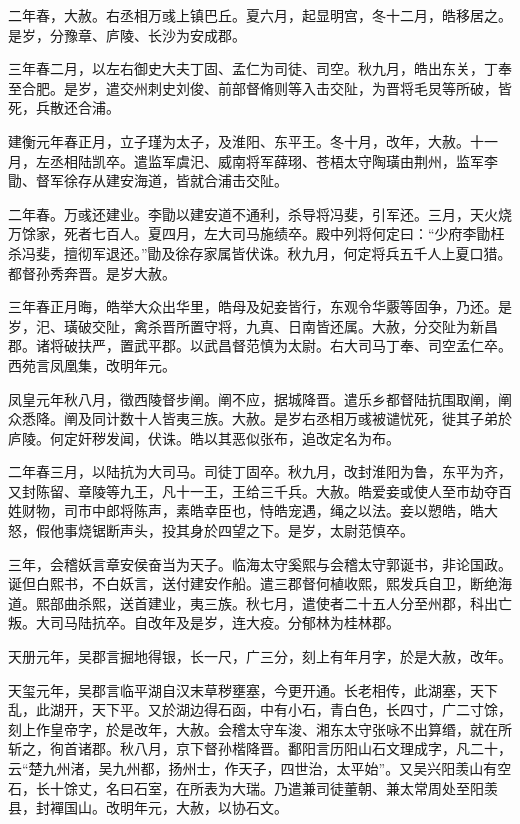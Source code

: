 \documentclass[12pt,UTF8]{ctexbook}
\begin{document}
二年春，大赦。右丞相万彧上镇巴丘。夏六月，起显明宫，冬十二月，皓移居之。是岁，分豫章、庐陵、长沙为安成郡。

三年春二月，以左右御史大夫丁固、孟仁为司徒、司空。秋九月，皓出东关，丁奉至合肥。是岁，遣交州刺史刘俊、前部督脩则等入击交阯，为晋将毛炅等所破，皆死，兵散还合浦。

建衡元年春正月，立子瑾为太子，及淮阳、东平王。冬十月，改年，大赦。十一月，左丞相陆凯卒。遣监军虞汜、威南将军薛珝、苍梧太守陶璜由荆州，监军李勖、督军徐存从建安海道，皆就合浦击交阯。

二年春。万彧还建业。李勖以建安道不通利，杀导将冯斐，引军还。三月，天火烧万馀家，死者七百人。夏四月，左大司马施绩卒。殿中列将何定曰：“少府李勖枉杀冯斐，擅彻军退还。”勖及徐存家属皆伏诛。秋九月，何定将兵五千人上夏口猎。都督孙秀奔晋。是岁大赦。

三年春正月晦，皓举大众出华里，皓母及妃妾皆行，东观令华覈等固争，乃还。是岁，汜、璜破交阯，禽杀晋所置守将，九真、日南皆还属。大赦，分交阯为新昌郡。诸将破扶严，置武平郡。以武昌督范慎为太尉。右大司马丁奉、司空孟仁卒。西苑言凤凰集，改明年元。

凤皇元年秋八月，徵西陵督步阐。阐不应，据城降晋。遣乐乡都督陆抗围取阐，阐众悉降。阐及同计数十人皆夷三族。大赦。是岁右丞相万彧被谴忧死，徙其子弟於庐陵。何定奸秽发闻，伏诛。皓以其恶似张布，追改定名为布。

二年春三月，以陆抗为大司马。司徒丁固卒。秋九月，改封淮阳为鲁，东平为齐，又封陈留、章陵等九王，凡十一王，王给三千兵。大赦。皓爱妾或使人至市劫夺百姓财物，司市中郎将陈声，素皓幸臣也，恃皓宠遇，绳之以法。妾以愬皓，皓大怒，假他事烧锯断声头，投其身於四望之下。是岁，太尉范慎卒。

三年，会稽妖言章安侯奋当为天子。临海太守奚熙与会稽太守郭诞书，非论国政。诞但白熙书，不白妖言，送付建安作船。遣三郡督何植收熙，熙发兵自卫，断绝海道。熙部曲杀熙，送首建业，夷三族。秋七月，遣使者二十五人分至州郡，科出亡叛。大司马陆抗卒。自改年及是岁，连大疫。分郁林为桂林郡。

天册元年，吴郡言掘地得银，长一尺，广三分，刻上有年月字，於是大赦，改年。

天玺元年，吴郡言临平湖自汉末草秽壅塞，今更开通。长老相传，此湖塞，天下乱，此湖开，天下平。又於湖边得石函，中有小石，青白色，长四寸，广二寸馀，刻上作皇帝字，於是改年，大赦。会稽太守车浚、湘东太守张咏不出算缗，就在所斩之，徇首诸郡。秋八月，京下督孙楷降晋。鄱阳言历阳山石文理成字，凡二十，云“楚九州渚，吴九州都，扬州士，作天子，四世治，太平始”。又吴兴阳羡山有空石，长十馀丈，名曰石室，在所表为大瑞。乃遣兼司徒董朝、兼太常周处至阳羡县，封襌国山。改明年元，大赦，以协石文。
\end{document}
